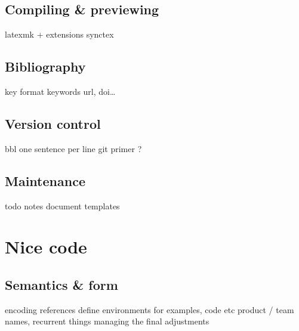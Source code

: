 \documentclass[a4paper,twoside,nofonts]{tufte-handout}
\begin{document}
\subsection{Compiling \& previewing} %
\label{sub:compiling}

\begin{todoenv}
    latexmk + extensions
    synctex
\end{todoenv}

\subsection{Bibliography} %
\label{sub:bibliography}

\begin{todoenv}
    key format
    keywords
    url, doi…
\end{todoenv}

\subsection{Version control} %
\label{sub:vcs}

\begin{todoenv}
    bbl
    one sentence per line
    git primer ?
\end{todoenv}

\subsection{Maintenance} %
\label{sub:maintenance}

\begin{todoenv}
    todo notes
    document templates
\end{todoenv}



\clearpage
\section{Nice code} %
\label{sec:code}

\subsection{Semantics \& form} %
\label{sub:semantics}

\begin{todoenv}
    encoding
    references
    define environments for examples, code etc
    product / team names, recurrent things
    managing the final adjustments
\end{todoenv}
\end{document}
